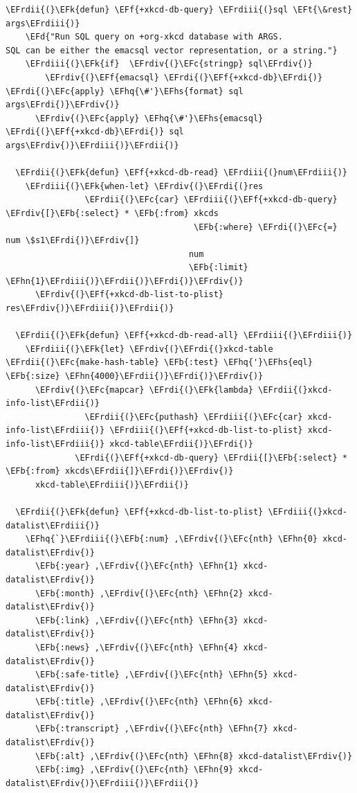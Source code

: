 \documentclass{scrartcl}
\newcommand{\EFk}[1]{\textcolor{EFk}{#1}} %
\newcommand{\EFd}[1]{\textcolor{EFd}{\textit{#1}}} %
\newcommand{\EFt}[1]{\textcolor{EFt}{#1}} %
\newcommand{\EFb}[1]{\textcolor{EFb}{#1}} %
\newcommand{\EFc}[1]{\textcolor{EFc}{#1}} %
\newcommand{\EFf}[1]{\textcolor{EFf}{#1}} %
\newcommand{\EFhn}[1]{\textcolor{EFhn}{\textbf{#1}}} %
\newcommand{\EFhq}[1]{\textcolor{EFhq}{#1}} %
\newcommand{\EFhs}[1]{\textcolor{EFhs}{#1}} %
\newcommand{\EFrdi}[1]{\textcolor{EFrdi}{#1}} %
\newcommand{\EFrdii}[1]{\textcolor{EFrdii}{#1}} %
\newcommand{\EFrdiii}[1]{\textcolor{EFrdiii}{#1}} %
\newcommand{\EFrdiv}[1]{\textcolor{EFrdiv}{#1}} %
\begin{document}
\begin{Code}
\begin{Verbatim}[]
  \EFrdii{(}\EFk{defun} \EFf{+xkcd-db-query} \EFrdiii{(}sql \EFt{\&rest} args\EFrdiii{)}
    \EFd{"Run SQL query on +org-xkcd database with ARGS.
SQL can be either the emacsql vector representation, or a string."}
    \EFrdiii{(}\EFk{if}  \EFrdiv{(}\EFc{stringp} sql\EFrdiv{)}
        \EFrdiv{(}\EFf{emacsql} \EFrdi{(}\EFf{+xkcd-db}\EFrdi{)} \EFrdi{(}\EFc{apply} \EFhq{\#'}\EFhs{format} sql args\EFrdi{)}\EFrdiv{)}
      \EFrdiv{(}\EFc{apply} \EFhq{\#'}\EFhs{emacsql} \EFrdi{(}\EFf{+xkcd-db}\EFrdi{)} sql args\EFrdiv{)}\EFrdiii{)}\EFrdii{)}

  \EFrdii{(}\EFk{defun} \EFf{+xkcd-db-read} \EFrdiii{(}num\EFrdiii{)}
    \EFrdiii{(}\EFk{when-let} \EFrdiv{(}\EFrdi{(}res
                \EFrdii{(}\EFc{car} \EFrdiii{(}\EFf{+xkcd-db-query} \EFrdiv{[}\EFb{:select} * \EFb{:from} xkcds
                                      \EFb{:where} \EFrdi{(}\EFc{=} num \$s1\EFrdi{)}\EFrdiv{]}
                                     num
                                     \EFb{:limit} \EFhn{1}\EFrdiii{)}\EFrdii{)}\EFrdi{)}\EFrdiv{)}
      \EFrdiv{(}\EFf{+xkcd-db-list-to-plist} res\EFrdiv{)}\EFrdiii{)}\EFrdii{)}

  \EFrdii{(}\EFk{defun} \EFf{+xkcd-db-read-all} \EFrdiii{(}\EFrdiii{)}
    \EFrdiii{(}\EFk{let} \EFrdiv{(}\EFrdi{(}xkcd-table \EFrdii{(}\EFc{make-hash-table} \EFb{:test} \EFhq{'}\EFhs{eql} \EFb{:size} \EFhn{4000}\EFrdii{)}\EFrdi{)}\EFrdiv{)}
      \EFrdiv{(}\EFc{mapcar} \EFrdi{(}\EFk{lambda} \EFrdii{(}xkcd-info-list\EFrdii{)}
                \EFrdii{(}\EFc{puthash} \EFrdiii{(}\EFc{car} xkcd-info-list\EFrdiii{)} \EFrdiii{(}\EFf{+xkcd-db-list-to-plist} xkcd-info-list\EFrdiii{)} xkcd-table\EFrdii{)}\EFrdi{)}
              \EFrdi{(}\EFf{+xkcd-db-query} \EFrdii{[}\EFb{:select} * \EFb{:from} xkcds\EFrdii{]}\EFrdi{)}\EFrdiv{)}
      xkcd-table\EFrdiii{)}\EFrdii{)}

  \EFrdii{(}\EFk{defun} \EFf{+xkcd-db-list-to-plist} \EFrdiii{(}xkcd-datalist\EFrdiii{)}
    \EFhq{`}\EFrdiii{(}\EFb{:num} ,\EFrdiv{(}\EFc{nth} \EFhn{0} xkcd-datalist\EFrdiv{)}
      \EFb{:year} ,\EFrdiv{(}\EFc{nth} \EFhn{1} xkcd-datalist\EFrdiv{)}
      \EFb{:month} ,\EFrdiv{(}\EFc{nth} \EFhn{2} xkcd-datalist\EFrdiv{)}
      \EFb{:link} ,\EFrdiv{(}\EFc{nth} \EFhn{3} xkcd-datalist\EFrdiv{)}
      \EFb{:news} ,\EFrdiv{(}\EFc{nth} \EFhn{4} xkcd-datalist\EFrdiv{)}
      \EFb{:safe-title} ,\EFrdiv{(}\EFc{nth} \EFhn{5} xkcd-datalist\EFrdiv{)}
      \EFb{:title} ,\EFrdiv{(}\EFc{nth} \EFhn{6} xkcd-datalist\EFrdiv{)}
      \EFb{:transcript} ,\EFrdiv{(}\EFc{nth} \EFhn{7} xkcd-datalist\EFrdiv{)}
      \EFb{:alt} ,\EFrdiv{(}\EFc{nth} \EFhn{8} xkcd-datalist\EFrdiv{)}
      \EFb{:img} ,\EFrdiv{(}\EFc{nth} \EFhn{9} xkcd-datalist\EFrdiv{)}\EFrdiii{)}\EFrdii{)}


\end{Verbatim}
\end{Code}
\end{document}
